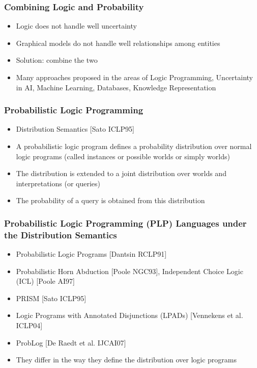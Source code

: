 \documentclass[trans]{beamer}
\newcommand{\myalert}[1]{{%
 #1}}
\begin{document}
\begin{frame}
  \frametitle{Combining Logic and Probability}
\begin{itemize}
\item Logic does not handle well uncertainty
\item Graphical models do not handle well relationships among entities
\item Solution: combine the two
\item Many approaches proposed in the areas of Logic Programming, Uncertainty in AI, Machine Learning, Databases, Knowledge Representation
\end{itemize}
\end{frame}
\begin{frame}
  \frametitle{Probabilistic Logic Programming}
\begin{itemize}
\item Distribution Semantics [Sato ICLP95]%
\item A probabilistic logic program defines a probability distribution over normal logic programs (called \myalert{instances} or \myalert{possible worlds} or simply \myalert{worlds})
\item The distribution is extended to a joint distribution over worlds and interpretations (or queries)
\item The probability of a query is obtained from this distribution
\end{itemize}
\end{frame}


\begin{frame}
  \frametitle{Probabilistic Logic Programming (PLP) Languages under the Distribution Semantics}
\begin{itemize}
\item Probabilistic Logic Programs [Dantsin RCLP91]%
\item Probabilistic Horn Abduction [Poole NGC93],
Independent Choice Logic (ICL) [Poole AI97]%
\item PRISM [Sato ICLP95]%
\item Logic Programs with Annotated Disjunctions (LPADs) [Vennekens et al. ICLP04]%
\item ProbLog [De Raedt et al. IJCAI07]%
\item They differ in the way they define the distribution over logic programs
\end{itemize}
\end{frame}
\end{document}
